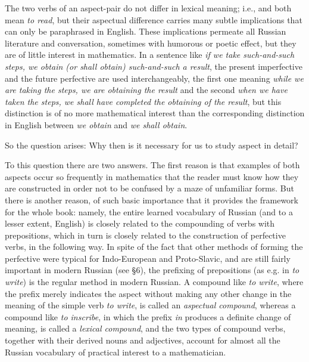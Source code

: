 The two verbs of an aspect-pair do not differ in lexical meaning; i.e.,  and  both mean \emph{to read}, but their aspectual difference carries many subtle implications that can only be paraphrased in English. These implications permeate all Russian literature and conversation, sometimes with humorous or poetic effect, but they are of little interest in mathematics. In a sentence like \emph{if we take such-and-such steps, we obtain (or shall obtain) such-and-such a result}, the present imperfective  and the future perfective  are used interchangeably, the first one meaning \emph{while we are taking the steps, we are obtaining the result} and the second \emph{when we have taken the steps, we shall have completed the obtaining of the result}, but this distinction is of no more mathematical interest than the corresponding distinction in English between \emph{we obtain} and \emph{we shall obtain}.

So the question arises: Why then is it necessary for us to study aspect in detail?

To this question there are two answers. The first reason is that examples of both aspects occur so frequently in mathematics that the reader must know how they are constructed in order not to be confused by a maze of unfamiliar forms. But there is another reason, of such basic importance that it provides the framework for the whole book: namely, the entire learned vocabulary of Russian (and to a lesser extent, English) is closely related to the compounding of verbs with prepositions, which in turn is closely related to the construction of perfective verbs, in the following way. In spite of the fact that other methods of forming the perfective were typical for Indo-European and Proto-Slavic, and are still fairly important in modern Russian (see §6), the prefixing of prepositions (as e.g. in  \emph{to write}) is the regular method in modern Russian. A compound like  \emph{to write}, where the prefix  merely indicates the aspect without making any other change in the meaning of the simple verb  \emph{to write}, is called an \emph{aspectual compound}, whereas a compound like  \emph{to inscribe}, in which the prefix  \emph{in} produces a definite change of meaning, is called a \emph{lexical compound}, and the two types of compound verbs, together with their derived nouns and adjectives, account for almost all the Russian vocabulary of practical interest to a mathematician.

